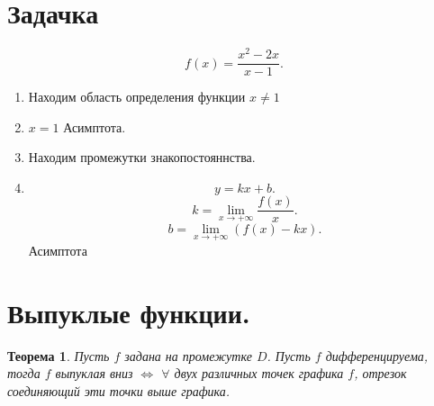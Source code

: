 \documentclass[a4paper]{scrartcl}
\newtheorem{theorem}{Теорема}
\begin{document}
\section{Задачка}
\[
f(x) = \frac{x^2 - 2x}{x - 1}
.\] 
\begin{enumerate}
    \item Находим область определения функции $x \neq 1$
    \item $x = 1$ Асимптота.
    \item   Находим промежутки знакопостояннства.
    \item
        \[
            y = kx + b
        .\] 
        \[
        k = \lim_{x \to + \infty} \frac{f(x)}{x}
        .\] 
        \[
        b = \lim_{x \to + \infty} (f(x) - kx)
        .\] 
        Асимптота
\end{enumerate}
\section{Выпуклые функции.}
\begin{theorem}
    Пусть $f$ задана на промежутке $D$. Пусть $f$ дифференцируема, тогда $f$ выпуклая вниз  $\iff$ $\forall $ двух различных точек графика $f$, отрезок соединяющий эти точки выше графика.
\end{theorem}
\end{document}
